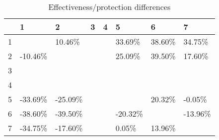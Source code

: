 \begin{table}[ht]
\centering
\begin{tabular}{rlllllll}
  \hline
 & 1 & 2 & 3 & 4 & 5 & 6 & 7 \\ 
  \hline
1 &  & 10.46\% &  &  & 33.69\% & 38.60\% & 34.75\% \\ 
  2 & -10.46\% &  &  &  & 25.09\% & 39.50\% & 17.60\% \\ 
  3 &  &  &  &  &  &  &  \\ 
  4 &  &  &  &  &  &  &  \\ 
  5 & -33.69\% & -25.09\% &  &  &  & 20.32\% & -0.05\% \\ 
  6 & -38.60\% & -39.50\% &  &  & -20.32\% &  & -13.96\% \\ 
  7 & -34.75\% & -17.60\% &  &  & 0.05\% & 13.96\% &  \\ 
   \hline
\end{tabular}
\caption{Effectiveness/protection differences} 
\end{table}
